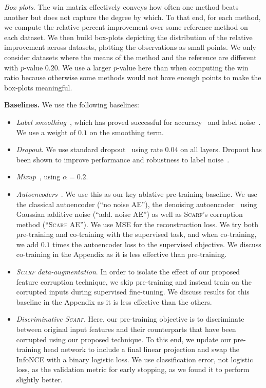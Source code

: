 \emph{Box plots}. The win matrix effectively conveys how often one method beats another but does not capture the degree by which. To that end, for each method, we compute the relative percent improvement over some reference method on each dataset. We then build box-plots depicting the distribution of the relative improvement across datasets, plotting the observations as small points. We only consider datasets where the means of the method and the reference are different with $p$-value $0.20$. We use a larger $p$-value here than when computing the win ratio because otherwise some methods would not have enough points to make the box-plots meaningful.

{\bf Baselines.} We use the following baselines:

\begin{itemize}
    \item \emph{Label smoothing}~\citep{szegedy2016rethinking}, which has proved successful for accuracy~\citep{muller2019does} and label noise~\citep{lukasik2020does}. We use a weight of $0.1$ on the smoothing term. 
    \item \emph{Dropout}. We use standard dropout~\citep{srivastava2014dropout} using rate $0.04$ on all layers. Dropout has been shown to improve performance and robustness to label noise~\citep{rusiecki2020standard}.
    \item \emph{Mixup}~\citep{zhang2017mixup}, using $\alpha = 0.2$.
    \item \emph{Autoencoders}~\citep{rumelhart1985learning}. We use this as our key ablative pre-training baseline. We use the classical autoencoder (``no noise AE''), the denoising autoencoder~\citep{vincent2008extracting,vincent2010stacked} using Gaussian additive noise (``add. noise AE'') as well as \textsc{Scarf}'s corruption method (``\textsc{Scarf} AE''). We use MSE for the reconstruction loss. We try both pre-training and co-training with the supervised task, and when co-training, we add $0.1$ times the autoencoder loss to the supervised objective. We discuss co-training in the Appendix as it is less effective than pre-training.
    \item \emph{\textsc{Scarf} data-augmentation}. In order to isolate the effect of our proposed feature corruption technique, we skip pre-training and instead train on the corrupted inputs during supervised fine-tuning. We discuss results for this baseline in the Appendix as it is less effective than the others.
    \item \emph{Discriminative \textsc{Scarf}}. Here, our pre-training objective is to discriminate between original input features and their counterparts that have been corrupted using our proposed technique. To this end, we update our pre-training head network to include a final linear projection and swap the InfoNCE with a binary logistic loss. We use classification error, not logistic loss, as the validation metric for early stopping, as we found it to perform slightly better.

\end{itemize}
